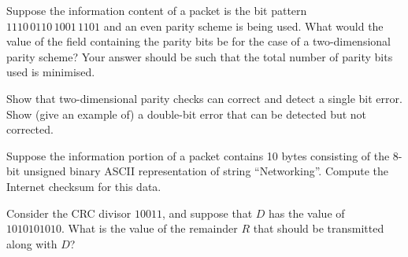 
\question Suppose the information content of a packet is the bit pattern $1110\,0110\,1001\,1101$ and an even parity scheme is being used.
What would the value of the field containing the parity bits be for the case of a two-dimensional parity scheme?
Your answer should be such that the total number of parity bits used is minimised.

\question Show that two-dimensional parity checks can correct and detect a single bit error. 
Show (give an example of) a double-bit error that can be detected but not corrected.

\question Suppose the information portion of a packet contains 10 bytes consisting of the 8-bit unsigned binary ASCII representation of string ``Networking''.
Compute the Internet checksum for this data.

\question Consider the CRC divisor $10011$, and suppose that $D$ has the value of $1010101010$. What is the value of the remainder $R$ that should be transmitted along with $D$?
